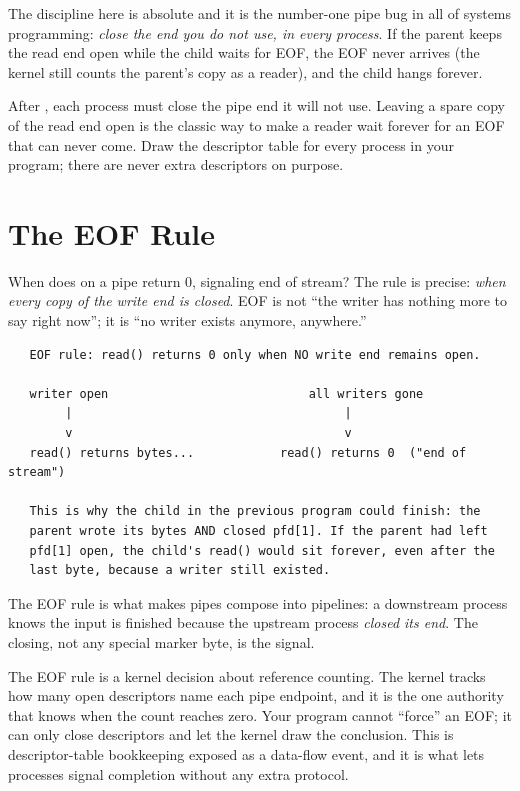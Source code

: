 The discipline here is absolute and it is the number-one pipe bug in
all of systems programming: \emph{close the end you do not use, in
every process}. If the parent keeps the read end open while the child
waits for EOF, the EOF never arrives (the kernel still counts the
parent's copy as a reader), and the child hangs forever.

\begin{ruleofthumb}
After , each process must close the pipe end it will not
use. Leaving a spare copy of the read end open is the classic way to
make a reader wait forever for an EOF that can never come. Draw the
descriptor table for every process in your program; there are never
extra descriptors on purpose.
\end{ruleofthumb}

\section{The EOF Rule}

When does  on a pipe return 0, signaling end of stream? The
rule is precise: \emph{when every copy of the write end is closed}.
EOF is not ``the writer has nothing more to say right now''; it is
``no writer exists anymore, anywhere.''

\begin{verbatim}
   EOF rule: read() returns 0 only when NO write end remains open.

   writer open                            all writers gone
        |                                      |
        v                                      v
   read() returns bytes...            read() returns 0  ("end of stream")

   This is why the child in the previous program could finish: the
   parent wrote its bytes AND closed pfd[1]. If the parent had left
   pfd[1] open, the child's read() would sit forever, even after the
   last byte, because a writer still existed.
\end{verbatim}

The EOF rule is what makes pipes compose into pipelines: a downstream
process knows the input is finished because the upstream process
\emph{closed its end}. The closing, not any special marker byte, is
the signal.

\begin{osconcept}
The EOF rule is a kernel decision about reference counting. The kernel
tracks how many open descriptors name each pipe endpoint, and it is the
one authority that knows when the count reaches zero. Your program
cannot ``force'' an EOF; it can only close descriptors and let the
kernel draw the conclusion. This is descriptor-table bookkeeping
exposed as a data-flow event, and it is what lets processes signal
completion without any extra protocol.
\end{osconcept}

